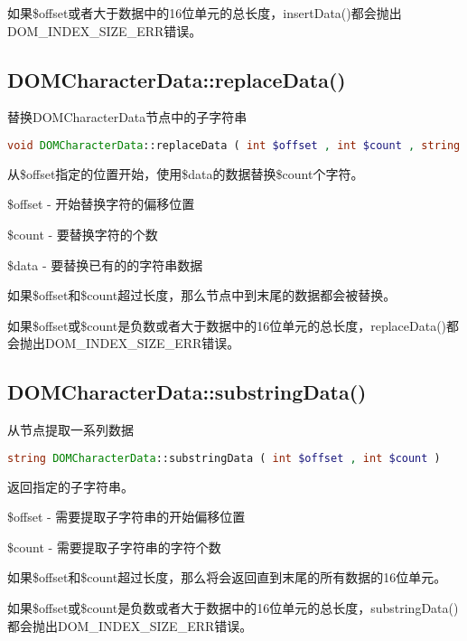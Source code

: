如果\$offset或者大于数据中的16位单元的总长度，insertData()都会抛出DOM\_INDEX\_SIZE\_ERR错误。

\subsection{DOMCharacterData::replaceData()}

替换DOMCharacterData节点中的子字符串

\begin{lstlisting}[language=PHP]
void DOMCharacterData::replaceData ( int $offset , int $count , string $data )
\end{lstlisting}

从\$offset指定的位置开始，使用\$data的数据替换\$count个字符。

\begin{compactitem}
\item \$offset - 开始替换字符的偏移位置
\item \$count - 要替换字符的个数
\item \$data - 要替换已有的的字符串数据
\end{compactitem}

如果\$offset和\$count超过长度，那么节点中到末尾的数据都会被替换。

如果\$offset或\$count是负数或者大于数据中的16位单元的总长度，replaceData()都会抛出DOM\_INDEX\_SIZE\_ERR错误。



\subsection{DOMCharacterData::substringData()}

从节点提取一系列数据

\begin{lstlisting}[language=PHP]
string DOMCharacterData::substringData ( int $offset , int $count )
\end{lstlisting}

返回指定的子字符串。

\begin{compactitem}
\item \$offset - 需要提取子字符串的开始偏移位置
\item \$count - 需要提取子字符串的字符个数
\end{compactitem}


如果\$offset和\$count超过长度，那么将会返回直到末尾的所有数据的16位单元。

如果\$offset或\$count是负数或者大于数据中的16位单元的总长度，substringData()都会抛出DOM\_INDEX\_SIZE\_ERR错误。




